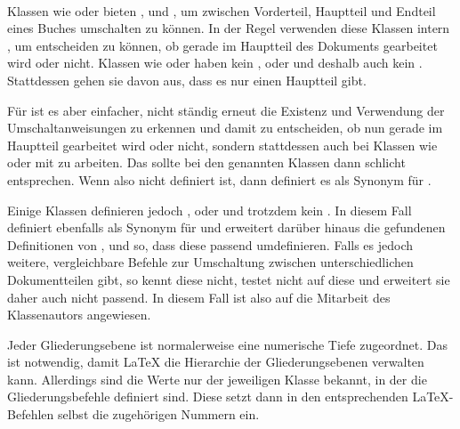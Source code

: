 \begin{Declaration}
  \ \ %
  \ \ 
\end{Declaration}
Klassen wie  oder  bieten
,
 und
, um zwischen Vorderteil,
Hauptteil und Endteil eines Buches umschalten zu können. In der Regel
verwenden diese Klassen intern , um entscheiden zu
können, ob gerade im Hauptteil des Dokuments gearbeitet wird oder
nicht. Klassen wie  oder  haben kein
,  oder
 und deshalb auch kein
. Stattdessen gehen sie davon aus, dass es nur einen
Hauptteil gibt.

Für  ist es aber einfacher, nicht ständig erneut die
Existenz und Verwendung der Umschaltanweisungen zu erkennen und damit zu
entscheiden, ob nun gerade im Hauptteil gearbeitet wird oder nicht, sondern
stattdessen auch bei Klassen wie  oder  mit
 zu arbeiten. Das sollte bei den genannten Klassen dann
schlicht  entsprechen. Wenn also
 nicht definiert ist, dann definiert 
es als Synonym für .

Einige Klassen definieren jedoch ,
 oder  und
trotzdem kein . In diesem Fall definiert
  ebenfalls als Synonym für
 und erweitert darüber hinaus die gefundenen Definitionen von
,  und
 so, dass diese  passend
umdefinieren. Falls es jedoch weitere, vergleichbare Befehle zur Umschaltung
zwischen unterschiedlichen Dokumentteilen gibt, so kennt 
diese nicht, testet nicht auf diese und erweitert sie daher auch nicht
passend. In diesem Fall ist  also auf die Mitarbeit des
Klassenautors angewiesen.%
\EndIndexGroup


\begin{Declaration}
\end{Declaration}
Jeder Gliederungsebene ist normalerweise eine numerische Tiefe
zugeordnet. Das ist notwendig, damit \LaTeX{} die Hierarchie der
Gliederungsebenen verwalten kann. Allerdings sind die Werte
nur der jeweiligen Klasse bekannt, in der die Gliederungsbefehle definiert
sind. Diese setzt dann in den entsprechenden \LaTeX-Befehlen selbst die
zugehörigen Nummern ein.


